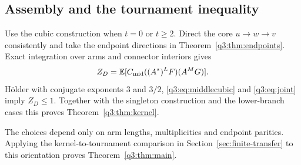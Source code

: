 \subsection{Assembly and the tournament inequality}
Use the cubic construction when $t=0$ or $t\ge2$. Direct the core $u\to w\to v$ consistently and take the endpoint directions in Theorem~\ref{q3:thm:endpoints}. Exact integration over arms and connector interiors gives
\[
 Z_D=\mathbb E[C_{\rm mid}((A^*)^LF)(A^MG)].
\]
H\"older with conjugate exponents $3$ and $3/2$, \eqref{q3:eq:middlecubic} and \eqref{q3:eq:joint} imply $Z_D\le1$. Together with the singleton construction and the lower-branch cases this proves Theorem~\ref{q3:thm:kernel}.

The choices depend only on arm lengths, multiplicities and endpoint
parities.  Applying the kernel-to-tournament comparison in
Section~\ref{sec:finite-transfer} to this orientation proves
Theorem~\ref{q3:thm:main}.
